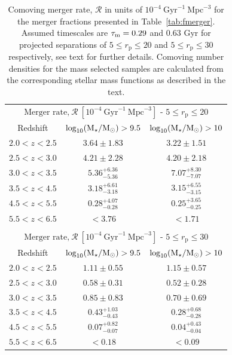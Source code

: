 \begin{table}
  \caption[Comoving merger rate, $\mathcal{R}$ in units of $10^{-4}~\text{Gyr}^{-1}~\text{Mpc}^{-3}$ for the merger fractions presented in Table~\ref{tab:fmerger}.]{Comoving merger rate, $\mathcal{R}$ in units of $10^{-4}~\text{Gyr}^{-1}~\text{Mpc}^{-3}$ for the merger fractions presented in Table~\ref{tab:fmerger}. Assumed timescales are $\tau_{\rm{m}} = 0.29$ and  $0.63$ Gyr for projected separations of $5 \leq r_{\text{p}} \leq 20$ and $5 \leq r_{\text{p}} \leq 30$ respectively, see text for further details. Comoving number densities for the mass selected samples are calculated from the corresponding stellar mass functions as described in the text.}
\centering
  \begin{tabular}{c|cc}
   \multicolumn{3}{c}{$\text{Merger~rate,}~\mathcal{R}~[10^{-4}~\text{Gyr}^{-1}~\text{Mpc}^{-3}]$ - $5 \leq r_{\text{p}} \leq 20$} \\ \noalign{\smallskip}
   Redshift  & $\log_{10}(\text{M}_{\star} / \text{M}_{\odot}) > 9.5$ & $\log_{10}(\text{M}_{\star} / \text{M}_{\odot}) > 10$ \\
    \hline
   $2.0 < z < 2.5$ & $3.64 \pm 1.83$ & $3.22 \pm 1.51$ \\
   $2.5 < z < 3.0$ & $4.21 \pm 2.28$ & $4.20 \pm 2.18$\\
   $3.0 < z < 3.5$ & $5.36^{+6.36}_{-5.36}$& $7.07^{+8.30}_{-7.07}$ \\
   $3.5 < z < 4.5$ & $3.18^{+6.61}_{-3.18}$& $3.15^{+6.55}_{-3.15}$ \\
   $4.5 < z < 5.5$ & $0.28^{+4.07}_{-0.28}$& $0.25^{+3.65}_{-0.25}$ \\
   $5.5 < z < 6.5$ & $<3.76$& $<1.71$\\  
    & & \\
    
   \multicolumn{3}{c}{$\text{Merger~rate,}~\mathcal{R}~[10^{-4}~\text{Gyr}^{-1}~\text{Mpc}^{-3}]$ - $5 \leq r_{\text{p}} \leq 30$} \\ \noalign{\smallskip}
   Redshift & $\log_{10}(\text{M}_{\star} / \text{M}_{\odot}) > 9.5$ & $\log_{10}(\text{M}_{\star} / \text{M}_{\odot}) > 10$ \\
    \hline
   $2.0 < z < 2.5$ & $1.11 \pm 0.55$ & $1.15 \pm 0.57$ \\
   $2.5 < z < 3.0$ & $0.58 \pm 0.31$ & $0.52 \pm 0.28$\\
   $3.0 < z < 3.5$ & $0.85 \pm 0.83$ & $0.70 \pm 0.69$ \\
   $3.5 < z < 4.5$ & $0.43^{+1.03}_{-0.43}$& $0.28^{+0.68}_{-0.28}$ \\
   $4.5 < z < 5.5$ & $0.07^{+0.82}_{-0.07}$& $0.04^{+0.43}_{-0.04}$ \\
   $5.5 < z < 6.5$ & $<0.18$ & $<0.09$\\  
    
  \end{tabular}\label{tab:merger_rate_dens}
\end{table}


